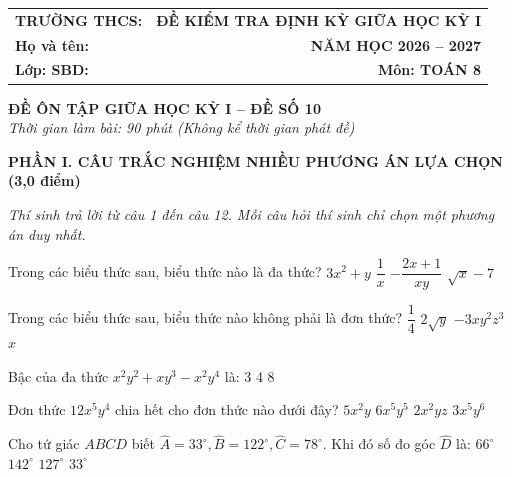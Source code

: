 \documentclass[12pt,a4paper]{article}
\begin{document}
\noindent
\begin{tabularx}{\linewidth}{X r}
\textbf{TRƯỜNG THCS: \dotfill} & \textbf{ĐỀ KIỂM TRA ĐỊNH KỲ GIỮA HỌC KỲ I} \\
\textbf{Họ và tên: \dotfill} & \textbf{NĂM HỌC 2026 -- 2027} \\
\textbf{Lớp: \dotfill \quad SBD: \dotfill} & \textbf{Môn: TOÁN 8} \\
\hline
\end{tabularx}
\vspace{2mm}

\begin{center}
  \textbf{\large ĐỀ ÔN TẬP GIỮA HỌC KỲ I -- ĐỀ SỐ 10}\\
  \textit{Thời gian làm bài: 90 phút (Không kể thời gian phát đề)}
\end{center}
\vspace{1mm}

\noindent\textbf{\large PHẦN I. CÂU TRẮC NGHIỆM NHIỀU PHƯƠNG ÁN LỰA CHỌN (3,0 điểm)}

\textit{Thí sinh trả lời từ câu 1 đến câu 12. Mỗi câu hỏi thí sinh chỉ chọn một phương án duy nhất.}

\vspace{1mm}
\begin{ex}
Trong các biểu thức sau, biểu thức nào là đa thức?
\choice
{\True $3x^2 + y$}
{$\dfrac{1}{x}$}
{$-\dfrac{2x + 1}{xy}$}
{$\sqrt{x} - 7$}
\end{ex}

\begin{ex}
Trong các biểu thức sau, biểu thức nào không phải là đơn thức?
\choice
{$\dfrac{1}{4}$}
{\True $2\sqrt{y}$}
{$-3xy^2z^3$}
{$x$}
\end{ex}

\begin{ex}
Bậc của đa thức $x^2y^2 + xy^3 - x^2y^4$ là:
\choice
{3}
{4}
{}
{8}
\end{ex}

\begin{ex}
Đơn thức $12x^5y^4$ chia hết cho đơn thức nào dưới đây?
\choice
{\True $5x^2y$}
{$6x^5y^5$}
{$2x^2yz$}
{$3x^5y^6$}
\end{ex}

\begin{ex}
Cho tứ giác $ABCD$ biết $\widehat{A} = 33^\circ, \widehat{B} = 122^\circ, \widehat{C} = 78^\circ$. Khi đó số đo góc $\widehat{D}$ là:
\choice
{$66^\circ$}
{$142^\circ$}
{\True $127^\circ$}
{$33^\circ$}
\end{ex}
\end{document}
